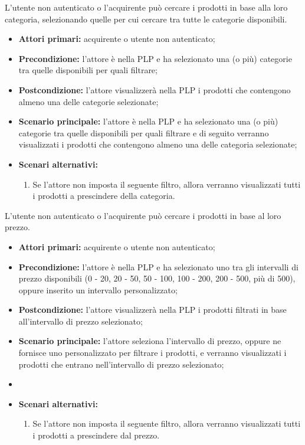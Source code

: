 L'utente non autenticato o l'acquirente può cercare i prodotti in base alla loro categoria, selezionando quelle per cui cercare tra tutte le categorie disponibili.
\begin{itemize}
    \item \textbf{Attori primari:} acquirente o utente non autenticato;
    \item \textbf{Precondizione:} l'attore è nella PLP e ha selezionato una (o più) categorie tra quelle disponibili per quali filtrare;
    \item \textbf{Postcondizione:} l'attore visualizzerà nella PLP i prodotti che contengono almeno una delle categorie selezionate;
    \item \textbf{Scenario principale:} l'attore è nella PLP e ha selezionato una (o più) categorie tra quelle disponibili per quali filtrare e di seguito verranno visualizzati i prodotti che contengono almeno una delle categoria selezionate;
    \item \textbf{Scenari alternativi:}
    \begin{enumerate}[label=\lett]
        \item Se l'attore non imposta il seguente filtro, allora verranno visualizzati tutti i prodotti a prescindere della categoria.
    \end{enumerate}
\end{itemize}

L'utente non autenticato o l'acquirente può cercare i prodotti in base al loro prezzo.
\begin{itemize}
    \item \textbf{Attori primari:} acquirente o utente non autenticato;
    \item \textbf{Precondizione:} l'attore è nella PLP e ha selezionato uno tra gli intervalli di prezzo disponibili (0 - 20, 20 - 50, 50 - 100, 100 - 200, 200 - 500, più di 500), oppure inserito un intervallo personalizzato;
    \item \textbf{Postcondizione:} l'attore visualizzerà nella PLP i prodotti filtrati in base all'intervallo di prezzo selezionato;
    \item \textbf{Scenario principale:} l'attore seleziona l'intervallo di prezzo, oppure ne fornisce uno personalizzato per filtrare i prodotti, e verranno visualizzati i prodotti che entrano nell'intervallo di prezzo selezionato;
    \item \item \textbf{Scenari alternativi:}
    \begin{enumerate}[label=\lett]
        \item Se l'attore non imposta il seguente filtro, allora verranno visualizzati tutti i prodotti a prescindere dal prezzo.
    \end{enumerate}
\end{itemize}

